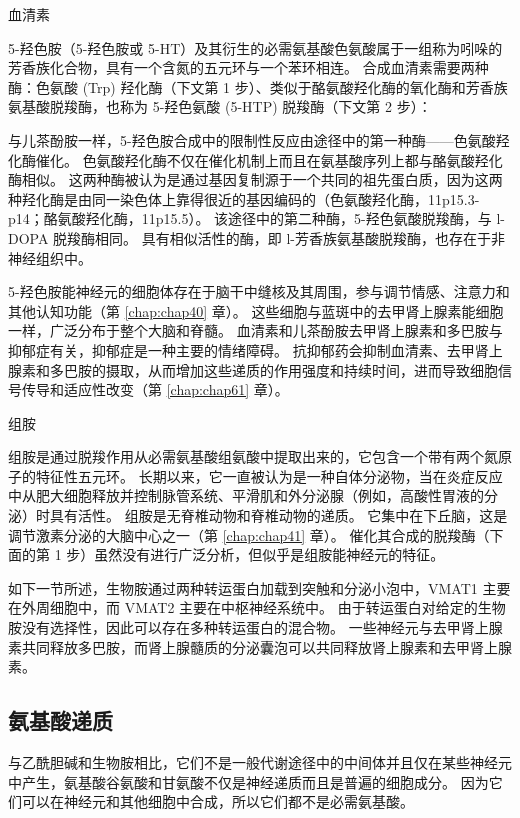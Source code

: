 血清素

5-羟色胺（5-羟色胺或 5-HT）及其衍生的必需氨基酸色氨酸属于一组称为吲哚的芳香族化合物，具有一个含氮的五元环与一个苯环相连。 合成血清素需要两种酶：色氨酸 (Trp) 羟化酶（下文第 1 步）、类似于酪氨酸羟化酶的氧化酶和芳香族氨基酸脱羧酶，也称为 5-羟色氨酸 (5-HTP) 脱羧酶（下文第 2 步）：


与儿茶酚胺一样，5-羟色胺合成中的限制性反应由途径中的第一种酶——色氨酸羟化酶催化。 
色氨酸羟化酶不仅在催化机制上而且在氨基酸序列上都与酪氨酸羟化酶相似。 
这两种酶被认为是通过基因复制源于一个共同的祖先蛋白质，因为这两种羟化酶是由同一染色体上靠得很近的基因编码的（色氨酸羟化酶，11p15.3-p14；酪氨酸羟化酶，11p15.5）。 
该途径中的第二种酶，5-羟色氨酸脱羧酶，与 l-DOPA 脱羧酶相同。 
具有相似活性的酶，即 l-芳香族氨基酸脱羧酶，也存在于非神经组织中。


5-羟色胺能神经元的细胞体存在于脑干中缝核及其周围，参与调节情感、注意力和其他认知功能（第 \ref{chap:chap40} 章）。 
这些细胞与蓝斑中的去甲肾上腺素能细胞一样，广泛分布于整个大脑和脊髓。 
血清素和儿茶酚胺去甲肾上腺素和多巴胺与抑郁症有关，抑郁症是一种主要的情绪障碍。 
抗抑郁药会抑制血清素、去甲肾上腺素和多巴胺的摄取，从而增加这些递质的作用强度和持续时间，进而导致细胞信号传导和适应性改变（第 \ref{chap:chap61} 章）。


组胺

组胺是通过脱羧作用从必需氨基酸组氨酸中提取出来的，它包含一个带有两个氮原子的特征性五元环。 
长期以来，它一直被认为是一种自体分泌物，当在炎症反应中从肥大细胞释放并控制脉管系统、平滑肌和外分泌腺（例如，高酸性胃液的分泌）时具有活性。 
组胺是无脊椎动物和脊椎动物的递质。 它集中在下丘脑，这是调节激素分泌的大脑中心之一（第 \ref{chap:chap41} 章）。 
催化其合成的脱羧酶（下面的第 1 步）虽然没有进行广泛分析，但似乎是组胺能神经元的特征。


如下一节所述，生物胺通过两种转运蛋白加载到突触和分泌小泡中，VMAT1 主要在外周细胞中，而 VMAT2 主要在中枢神经系统中。 
由于转运蛋白对给定的生物胺没有选择性，因此可以存在多种转运蛋白的混合物。 
一些神经元与去甲肾上腺素共同释放多巴胺，而肾上腺髓质的分泌囊泡可以共同释放肾上腺素和去甲肾上腺素。




\subsection{氨基酸递质}
与乙酰胆碱和生物胺相比，它们不是一般代谢途径中的中间体并且仅在某些神经元中产生，氨基酸谷氨酸和甘氨酸不仅是神经递质而且是普遍的细胞成分。 
因为它们可以在神经元和其他细胞中合成，所以它们都不是必需氨基酸。


